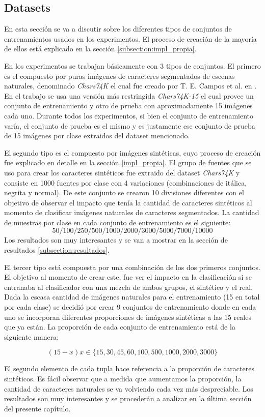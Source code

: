 \subsection{Datasets}


	En esta sección se va a discutir sobre los diferentes tipos de conjuntos de entrenamientos usados en los experimentos. El proceso de creación de la mayoría de ellos está explicado en la sección \ref{subsection:impl_propia}.
	
	En los experimentos se trabajan básicamente con 3 tipos de conjuntos. El primero es el compuesto por puras imágenes de caracteres segmentados de escenas naturales, denominado \textit{Chars74K} el cual fue creado por T. E. Campos et al. en \cite{dCBV09}. En el trabajo se usa una versión más restringida \textit{Chars74K-15} el cual provee un conjunto de entrenamiento y otro de prueba con aproximadamente 15 imágenes cada uno. Durante todos los experimentos, si bien el conjunto de entrenamiento varía, el conjunto de prueba es el mismo y es justamente ese conjunto de prueba de 15 imágenes por clase extraidos del dataset mencionado.
	
	El segundo tipo es el compuesto por imágenes sintéticas, cuyo proceso de creación fue explicado en detalle en la sección \ref{impl_propia}. El grupo de fuentes que se uso para crear los caracteres sintéticos fue extraido del dataset \textit{Chars74K} y consiste en 1000 fuentes por clase con 4 variaciones (combinaciones de itálica, negrita y normal). De este conjunto se crearon 10 divisiones diferentes con el objetivo de observar el impacto que tenía la cantidad de caracteres sintéticos al momento de clasificar imágenes naturales de caracteres segmentados. La cantidad de muestras por clase en cada conjunto de entrenamiento es el siguiente:
	 $$50/100/250/500/1000/2000/3000/5000/7000/10000$$
	 Los resultados son muy interesantes y se van a mostrar en la sección de resultados \ref{subsection:resultados}.
	
	El tercer tipo está compuesta por una combinación de los dos primeros conjuntos. El objetivo al momento de crear este, fue ver el impacto en la clasificación si se entranaba al clasificador con una mezcla de ambos grupos, el sintético y el real. Dada la escasa cantidad de imágenes naturales para el entrenamiento (15 en total por cada clase) se decidió por crear 9 conjuntos de entrenamiento donde en cada uno se incorporan diferentes proporciones de imágenes sintéticas a las 15 reales que ya están. La proporción de cada conjunto de entrenamiento está de la siguiente manera: 
	
	$$(15-x) x \in \{ 15,30,45,60,100,500,1000,2000,3000 \}$$
	
	El segundo elemento de cada tupla hace referencia a la proporción de caracteres sintéticos. Es fácil observar que a medida que aumentamos la proporción, la cantidad de caracteres naturales se va volviendo cada vez más despreciable. Los resultados son muy interesantes y se procederán a analizar en la última sección del presente capítulo.
	

